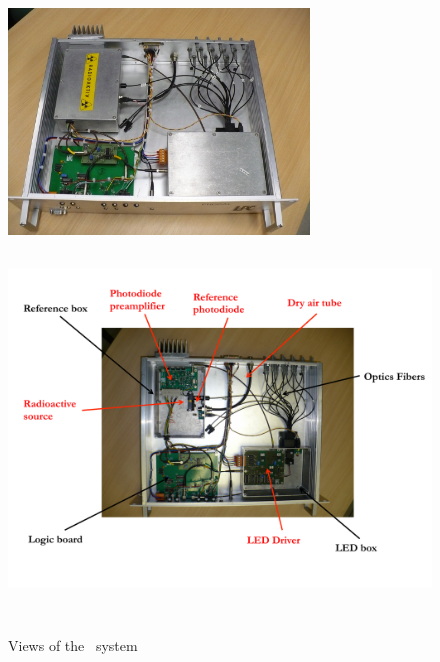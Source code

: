 \begin{figure}[htbp]
\centering
\includegraphics[height=6cm]{figures/phocal1.JPG}
\includegraphics[height=10cm]{figures/phocal2_comm.pdf}
\caption{Views of the \phocal~system}\label{fig:lasphocal}
\end{figure}
